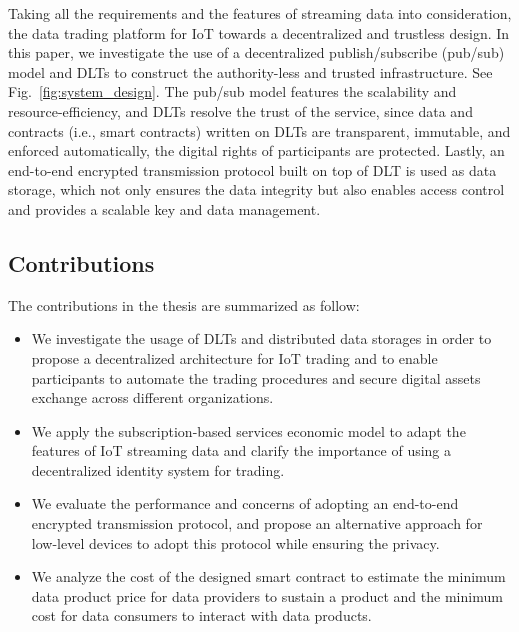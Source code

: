 \begin{spacing}{2.0}
Taking all the requirements and the features of streaming data into consideration, the data trading platform for IoT towards a decentralized and trustless design. In this paper, we investigate the use of a decentralized publish/subscribe (pub/sub) model and DLTs to construct the authority-less and trusted infrastructure. See Fig.~\ref{fig:system_design}. The pub/sub model features the scalability and resource-efficiency, and DLTs resolve the trust of the service, since data and contracts (i.e., smart contracts) written on DLTs are transparent, immutable, and enforced automatically, the digital rights of participants are protected. Lastly, an end-to-end encrypted transmission protocol built on top of DLT is used as data storage, which not only ensures the data integrity but also enables access control and provides a scalable key and data management.

\subsection{Contributions}
The contributions in the thesis are summarized as follow:
\begin{itemize}
    \item We investigate the usage of DLTs and distributed data storages in order to propose a decentralized architecture for IoT trading and to enable participants to automate the trading procedures and secure digital assets exchange across different organizations.
    \item We apply the subscription-based services economic model to adapt the features of IoT streaming data and clarify the importance of using a decentralized identity system for trading.
    \item We evaluate the performance and concerns of adopting an end-to-end encrypted transmission protocol, and propose an alternative approach for low-level devices to adopt this protocol while ensuring the privacy.
    \item We analyze the cost of the designed smart contract to estimate the minimum data product price for data providers to sustain a product and the minimum cost for data consumers to interact with data products.
\end{itemize}
\clearpage


\end{spacing}
